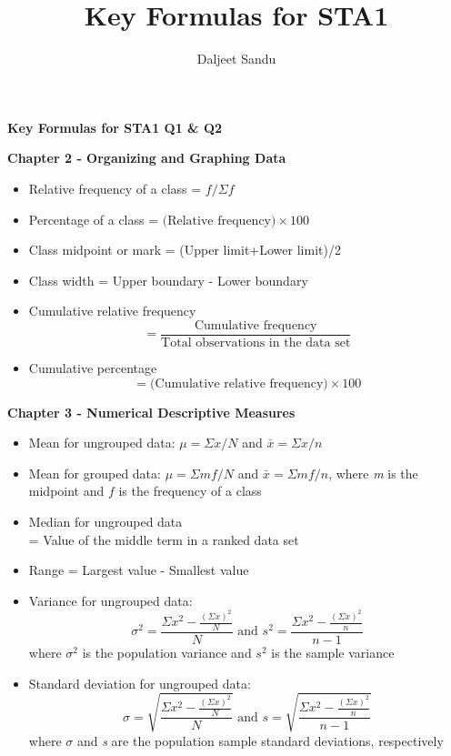 \documentclass[a4paper, 10pt]{article}
\title{Key Formulas for STA1}
\author{Daljeet Sandu}
\begin{document}
\font=2pt %
\begin{center}
\Large{\textbf{Key Formulas for STA1 Q1 \& Q2}}
\end{center}
\begin{multicols}{2}
\noindent
\textbf{Chapter 2 - Organizing and Graphing Data}
\begin{itemize}
	\item Relative frequency of a class = $f/\Sigma f$
	\item Percentage of a class = $\textrm{(Relative frequency)} \times 100$
	\item Class midpoint or mark = (Upper limit+Lower limit)/2
    \item Class width = Upper boundary - Lower boundary
    \item Cumulative relative frequency \\
    	\[ = \frac{\textrm{Cumulative frequency}}{\textrm{Total observations in the data set}} \]
	\item Cumulative percentage
    	\[ = \textrm{(Cumulative relative frequency)} \times 100 \]
\end{itemize}
\textbf{Chapter 3 - Numerical Descriptive Measures}
\begin{itemize}
	\item Mean for ungrouped data: $\mu = \Sigma x /N$ and $\bar{x} = \Sigma x/n$
	\item Mean for grouped data: $\mu = \Sigma mf /N$ and $\bar{x} = \Sigma mf/n$, where \textit{m} is the midpoint and $f$ is the frequency of a class
    \item Median for ungrouped data \\
    \hfill= Value of the middle term in a ranked data set
    \item Range = Largest value - Smallest value
    \item Variance for ungrouped data: \\ \font=9pt
    \[ \sigma^2 = \frac{\Sigma x^2 - \frac{(\Sigma x)^2}{N}}{N} \textrm{ and } s^2 = \frac{\Sigma x^2 - \frac{(\Sigma x)^2}{n}}{n-1} \]
    \font=2pt where $\sigma^2$ is the population variance and $s^2$ is the sample variance
    \item Standard deviation for ungrouped data: \\ \font=9pt
    \[ \sigma = \sqrt{\frac{\Sigma x^2 - \frac{(\Sigma x)^2}{N}}{N}} \textrm{ and } s = \sqrt{\frac{\Sigma x^2 - \frac{(\Sigma x)^2}{n}}{n-1}} \] \font=2pt where $\sigma$ and \textit{s} are the population sample standard deviations, respectively

\end{itemize}
\end{multicols}
\end{document}
